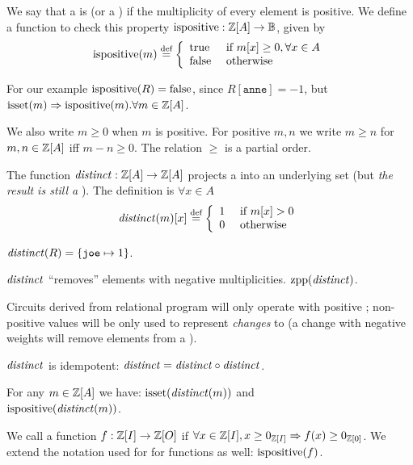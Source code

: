 \begin{definition}
We say that a \zr is  (or a ) if the multiplicity of every element is
positive. We define a function to check this property
$\mbox{ispositive} : \mathbb{Z}[A] \rightarrow \mathbb{B}$, given by
$$\mbox{ispositive}(m) \stackrel{\textrm{\scriptsize def}}{=} \left\{
\begin{array}{ll}
  \mbox{true} & \mbox{ if } m[x] \geq 0, \forall x \in A \\
  \mbox{false} & \mbox{ otherwise}
\end{array}
\right.$$
\end{definition}
For our example $\mbox{ispositive}(R) = \mbox{false}$, since $R[\texttt{anne}] = -1$,
but $\mbox{isset}(m) \Rightarrow \mbox{ispositive}(m). \forall m \in \mathbb{Z}[A]$.

We also write $m \geq 0$ when $m$ is
positive.  For positive $m, n$ we write $m \geq n$ for $m, n
\in \mathbb{Z}[A]$ iff $m - n \geq 0$.  The relation $\geq$ is a partial order.

\begin{definition}
The function $\mathit{distinct}: \mathbb{Z}[A] \rightarrow \mathbb{Z}[A]$
projects a \zr into an underlying set (but \emph{the result is
  still a \zr}).  The definition is $\forall x \in A$
$$\mathit{distinct}(m)[x] \stackrel{\textrm{\scriptsize def}}{=} \left\{
\begin{array}{ll}
  1 & \mbox{ if } m[x] > 0 \\
  0 & \mbox{ otherwise}
\end{array}
\right.
$$
\end{definition}
$\mathit{distinct}(R) = \{ \texttt{joe} \mapsto 1 \}$.

$\mathit{distinct}$ ``removes'' elements with negative multiplicities.  $\mbox{zpp}(\mathit{distinct})$.

Circuits derived from relational program will only operate with positive \zrs;
non-positive values will be only used to represent \emph{changes} to \zrs
(a change with negative weights will remove elements from a \zr).

\begin{proposition}
$\mathit{distinct}$ is idempotent: $\mathit{distinct} = \mathit{distinct} \circ \mathit{distinct}$.
\end{proposition}

\begin{proposition}
For any $m \in \mathbb{Z}[A]$ we have: $\mbox{isset}(\mathit{distinct}(m))$ and \\
$\mbox{ispositive}(\mathit{distinct}(m))$.
\end{proposition}

We call a function $f : \mathbb{Z}[I] \rightarrow \mathbb{Z}[O]$  if
$\forall x \in \mathbb{Z}[I], x \geq 0_{\mathbb{Z}[I]} \Rightarrow f(x) \geq 0_{\mathbb{Z}[0]}$.
We extend the notation used for \zrs for functions as well: $\mbox{ispositive}(f)$.

